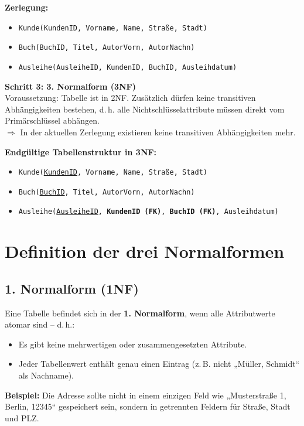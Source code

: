\documentclass{article}
\begin{document}
	\textbf{Zerlegung:}
	\begin{itemize}
		\item \texttt{Kunde(KundenID, Vorname, Name, Straße, Stadt)}
		\item \texttt{Buch(BuchID, Titel, AutorVorn, AutorNachn)}
		\item \texttt{Ausleihe(AusleiheID, KundenID, BuchID, Ausleihdatum)}
	\end{itemize}
	
	\vspace{1em}
	
	\textbf{Schritt 3: 3. Normalform (3NF)}\\
	Voraussetzung: Tabelle ist in 2NF. Zusätzlich dürfen keine transitiven Abhängigkeiten bestehen, d.\,h. alle Nichtschlüsselattribute müssen direkt vom Primärschlüssel abhängen.\\
	$\Rightarrow$ In der aktuellen Zerlegung existieren keine transitiven Abhängigkeiten mehr.
	
	\textbf{Endgültige Tabellenstruktur in 3NF:}
	\begin{itemize}
		\item \texttt{Kunde(\underline{KundenID}, Vorname, Name, Straße, Stadt)}
		\item \texttt{Buch(\underline{BuchID}, Titel, AutorVorn, AutorNachn)}
		\item \texttt{Ausleihe(\underline{AusleiheID}, \textbf{KundenID (FK)}, \textbf{BuchID (FK)}, Ausleihdatum)}
	\end{itemize}
	
	
	
\section*{Definition der drei Normalformen}

\subsection*{1. Normalform (1NF)}
Eine Tabelle befindet sich in der \textbf{1. Normalform}, wenn alle Attributwerte atomar sind – d.\,h.:
\begin{itemize}
	\item Es gibt keine mehrwertigen oder zusammengesetzten Attribute.
	\item Jeder Tabellenwert enthält genau einen Eintrag (z.\,B. nicht „Müller, Schmidt“ als Nachname).
\end{itemize}

\textbf{Beispiel:} Die Adresse sollte nicht in einem einzigen Feld wie „Musterstraße 1, Berlin, 12345“ gespeichert sein, sondern in getrennten Feldern für Straße, Stadt und PLZ.
\end{document}
